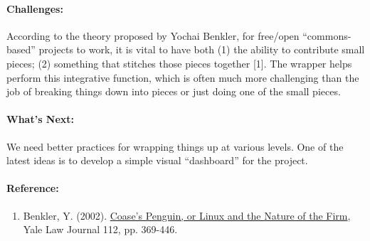\paragraph{Challenges:} According to the theory proposed by Yochai Benkler,
for free/open ``commons-based'' projects to work, it is vital to have
both (1) the ability to contribute small pieces; (2) something that
stitches those pieces together {[}1{]}. The wrapper helps perform this
integrative function, which is often much more challenging than the job
of breaking things down into pieces or just doing one of the small
pieces.

\paragraph{What's Next:}
We need better practices for wrapping things up at
various levels.  One of the latest ideas is to develop a simple visual
``dashboard'' for the project.

\paragraph{Reference:}

\begin{enumerate}
\itemsep1pt\parskip0pt
\item
  Benkler, Y.
  (2002). \href{http://www.yale.edu/yalelj/112/BenklerWEB.pdf}{Coase's
  Penguin, or Linux and the Nature of the Firm}, Yale Law Journal 112,
  pp. 369-446.
\end{enumerate}
